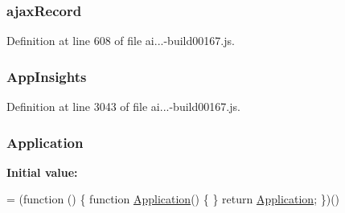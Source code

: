 \subsubsection[{\texorpdfstring{ajax\+Record}{ajaxRecord}}]{ ajax\+Record}\hypertarget{_scripts_2ai_80_822_89-build00167_8js_a7cd47fdf5f914d968bcb1c0bd808b2a5}{}\label{_scripts_2ai_80_822_89-build00167_8js_a7cd47fdf5f914d968bcb1c0bd808b2a5}


Definition at line 608 of file ai...-\/build00167.\+js.

\subsubsection[{\texorpdfstring{App\+Insights}{AppInsights}}]{ App\+Insights}\hypertarget{_scripts_2ai_80_822_89-build00167_8js_a991a37a9fbd0b268560e6c895644a9dd}{}\label{_scripts_2ai_80_822_89-build00167_8js_a991a37a9fbd0b268560e6c895644a9dd}


Definition at line 3043 of file ai...-\/build00167.\+js.

\subsubsection[{\texorpdfstring{Application}{Application}}]{ Application}\hypertarget{_scripts_2ai_80_822_89-build00167_8js_ad06be159591b6802b5db7e36265c7ed5}{}\label{_scripts_2ai_80_822_89-build00167_8js_ad06be159591b6802b5db7e36265c7ed5}
{\bfseries Initial value\+:}
\begin{DoxyCode}
= (\textcolor{keyword}{function} () \{
                \textcolor{keyword}{function} \hyperlink{obj_2_release_2_package_2_package_tmp_2_scripts_2ai_80_822_89-build00167_8js_ad06be159591b6802b5db7e36265c7ed5}{Application}() \{
                \}
                \textcolor{keywordflow}{return} \hyperlink{obj_2_release_2_package_2_package_tmp_2_scripts_2ai_80_822_89-build00167_8js_ad06be159591b6802b5db7e36265c7ed5}{Application};
            \})()
\end{DoxyCode}


